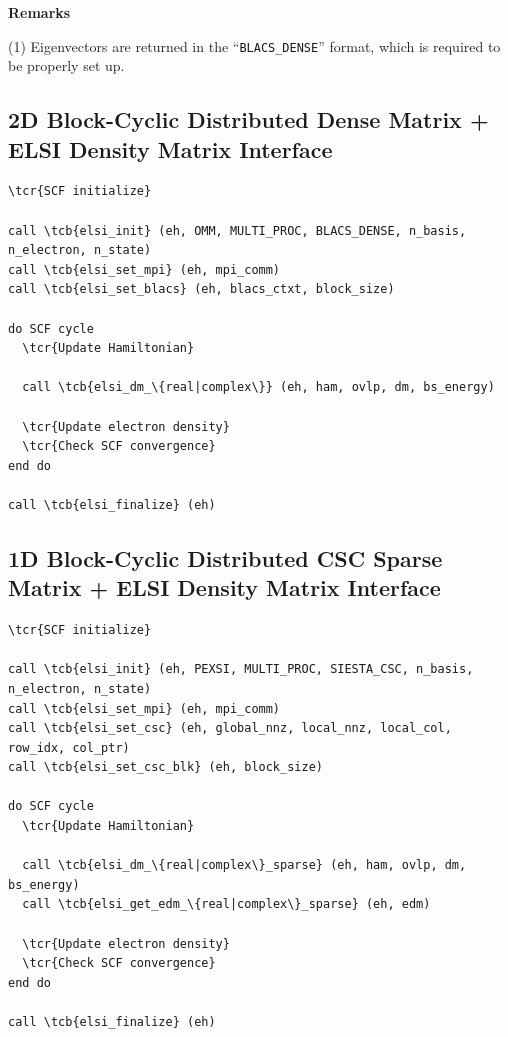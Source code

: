 \documentclass{report}
\newcommand{\tcb}[1]{\textcolor{blue}{#1}}
\newcommand{\tcr}[1]{\textcolor{red}{#1}}
\begin{document}
\textbf{Remarks}

(1) Eigenvectors are returned in the ``\texttt{BLACS\_DENSE}'' format, which is required to be properly set up.

\subsection*{2D Block-Cyclic Distributed Dense Matrix + ELSI Density Matrix Interface}
\begin{tcolorbox}
\begin{Verbatim}[commandchars=\\\{\}]
\tcr{SCF initialize}

call \tcb{elsi_init} (eh, OMM, MULTI_PROC, BLACS_DENSE, n_basis, n_electron, n_state)
call \tcb{elsi_set_mpi} (eh, mpi_comm)
call \tcb{elsi_set_blacs} (eh, blacs_ctxt, block_size)

do SCF cycle
  \tcr{Update Hamiltonian}

  call \tcb{elsi_dm_\{real|complex\}} (eh, ham, ovlp, dm, bs_energy)

  \tcr{Update electron density}
  \tcr{Check SCF convergence}
end do

call \tcb{elsi_finalize} (eh)
\end{Verbatim}
\end{tcolorbox}

\subsection*{1D Block-Cyclic Distributed CSC Sparse Matrix + ELSI Density Matrix Interface}
\begin{tcolorbox}
\begin{Verbatim}[commandchars=\\\{\}]
\tcr{SCF initialize}

call \tcb{elsi_init} (eh, PEXSI, MULTI_PROC, SIESTA_CSC, n_basis, n_electron, n_state)
call \tcb{elsi_set_mpi} (eh, mpi_comm)
call \tcb{elsi_set_csc} (eh, global_nnz, local_nnz, local_col, row_idx, col_ptr)
call \tcb{elsi_set_csc_blk} (eh, block_size)

do SCF cycle
  \tcr{Update Hamiltonian}

  call \tcb{elsi_dm_\{real|complex\}_sparse} (eh, ham, ovlp, dm, bs_energy)
  call \tcb{elsi_get_edm_\{real|complex\}_sparse} (eh, edm)

  \tcr{Update electron density}
  \tcr{Check SCF convergence}
end do

call \tcb{elsi_finalize} (eh)
\end{Verbatim}
\end{tcolorbox}
\end{document}
